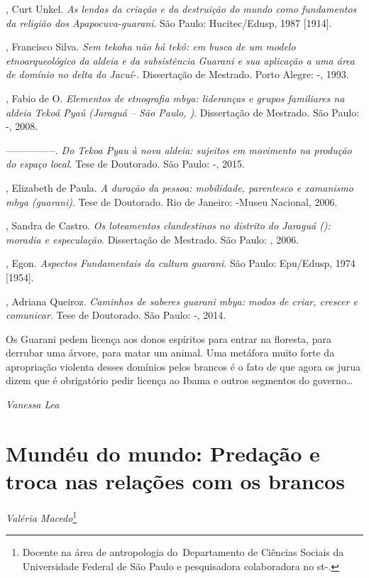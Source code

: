 {\begin{Parskip}
, Curt Unkel. \emph{As lendas da criação e da destruição do mundo
como fundamentos da religião dos Apapocuva-guarani}. São Paulo:
Hucitec/Edusp, 1987 [1914].

, Francisco Silva. \emph{Sem tekoha não há tekó: em busca de um modelo
etnoarqueológico da aldeia e da subsistência Guarani e sua aplicação a
uma área de domínio no delta do Jacuí-}. Dissertação de Mestrado.
Porto Alegre: -, 1993.

  , Fabio de O. \emph{Elementos de etnografia mbya: lideranças
e grupos familiares na aldeia Tekoá Pyaú (Jaraguá – São Paulo, )}.
Dissertação de Mestrado. São Paulo: -, 2008.

—————. \emph{Do Tekoa Pyau à nova aldeia: sujeitos em movimento na produção do
espaço local}. Tese de Doutorado. São Paulo: -, 2015.

, Elizabeth de Paula. \emph{A duração da pessoa: mobilidade,
parentesco e xamanismo mbya (guarani)}. Tese de Doutorado. Rio de
Janeiro: -Museu Nacional, 2006.  

, Sandra de Castro. \emph{Os loteamentos clandestinos no distrito do
Jaraguá (): moradia e especulação}. Dissertação de Mestrado. São
Paulo: , 2006.

, Egon. \emph{Aspectos Fundamentais da cultura guarani}. São Paulo:
Epu/Edusp, 1974 [1954].

, Adriana Queiroz. \emph{Caminhos de saberes guarani mbya: modos de
criar, crescer e comunicar}. Tese de Doutorado. São Paulo: -,
2014.
\end{Parskip}

Os Guarani pedem licença aos donos espíritos para entrar na floresta,
para derrubar uma árvore, para matar um animal. Uma metáfora muito
forte da apropriação violenta desses domínios pelos brancos é o fato de
que agora os jurua dizem que é obrigatório pedir licença ao Ibama e
outros segmentos do governo\ldots{}
\medskip
\begin{flushright}
\emph{Vanessa Lea}
\end{flushright}

\chapter{Mundéu do mundo: Predação e troca nas relações com os brancos} 
\begin{flushright}
\emph{Valéria Macedo}\footnote{Docente na área de antropologia
do~Departamento de Ciências Sociais da Universidade Federal de São
Paulo e pesquisadora colaboradora no st-.}
\end{flushright}
\medskip

}
